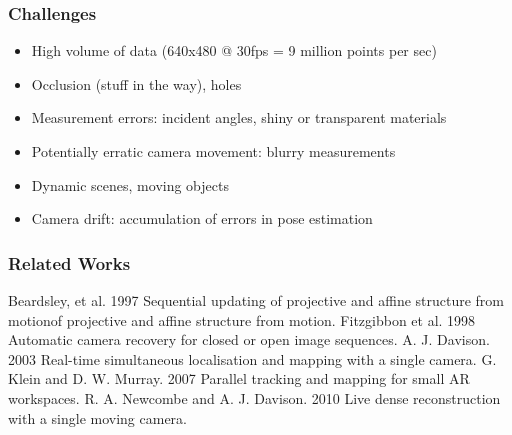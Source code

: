 \begin{frame}
\frametitle{Challenges}
\begin{itemize}
  \item High volume of data (640x480 @ 30fps = 9 million points per sec)
  \item Occlusion (stuff in the way), holes
  \item Measurement errors: incident angles, shiny or transparent materials
  \item Potentially erratic camera movement: blurry measurements
  \item Dynamic scenes, moving objects
  \item Camera drift: accumulation of errors in pose estimation
\end{itemize}
\end{frame}

\begin{frame}[allowframebreaks]
  \frametitle<presentation>{Related Works}
  \begin{thebibliography}{1}
  \beamertemplatearticlebibitems

  \newblock Beardsley, et al. 1997
\newblock Sequential updating of projective and affine structure from motionof projective and affine structure from motion.
  \newblock Fitzgibbon et al. 1998
  \newblock Automatic camera recovery for closed or open image sequences.
  \newblock A. J. Davison. 2003
  \newblock Real-time simultaneous localisation and mapping with a single camera.
  \newblock G. Klein and D. W. Murray. 2007
  \newblock Parallel tracking and mapping for small AR workspaces.
  \newblock R. A. Newcombe and A. J. Davison. 2010
  \newblock Live dense reconstruction with a single moving camera.
  \end{thebibliography}
\end{frame}
